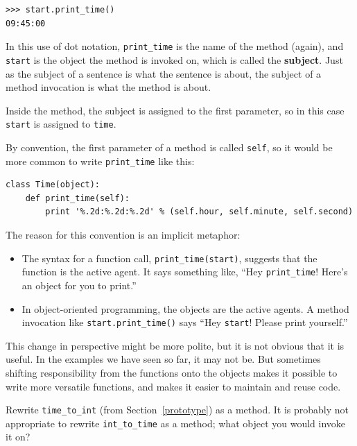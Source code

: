\documentclass[10pt]{book}
\begin{document}
\begin{CJK}{UTF8}{gbsn}
\begin{verbatim}
>>> start.print_time()
09:45:00
\end{verbatim}
%
In this use of dot notation, \verb"print_time" is the name of the
method (again), and {\tt start} is the object the method is
invoked on, which is called the {\bf subject}.  Just as the
subject of a sentence is what the sentence is about, the subject
of a method invocation is what the method is about.

Inside the method, the subject is assigned to the first
parameter, so in this case {\tt start} is assigned
to {\tt time}.

By convention, the first parameter of a method is
called {\tt self}, so it would be more common to write
\verb"print_time" like this:

\begin{verbatim}
class Time(object):
    def print_time(self):
        print '%.2d:%.2d:%.2d' % (self.hour, self.minute, self.second)
\end{verbatim}
%
The reason for this convention is an implicit metaphor:

\begin{itemize}

\item The syntax for a function call, \verb"print_time(start)",
  suggests that the function is the active agent.  It says something
  like, ``Hey \verb"print_time"!  Here's an object for you to print.''

\item In object-oriented programming, the objects are the active
  agents.  A method invocation like \verb"start.print_time()" says
  ``Hey {\tt start}!  Please print yourself.''

\end{itemize}

This change in perspective might be more polite, but it is not obvious
that it is useful.  In the examples we have seen so far, it may not
be.  But sometimes shifting responsibility from the functions onto the
objects makes it possible to write more versatile functions, and makes
it easier to maintain and reuse code.

\begin{exercise}
\label{convert}

Rewrite \verb"time_to_int" (from Section~\ref{prototype}) as a method.
It is probably not appropriate to rewrite \verb"int_to_time" as a
method; what object you would invoke it on?


\end{exercise}
\end{CJK}
\end{document}
